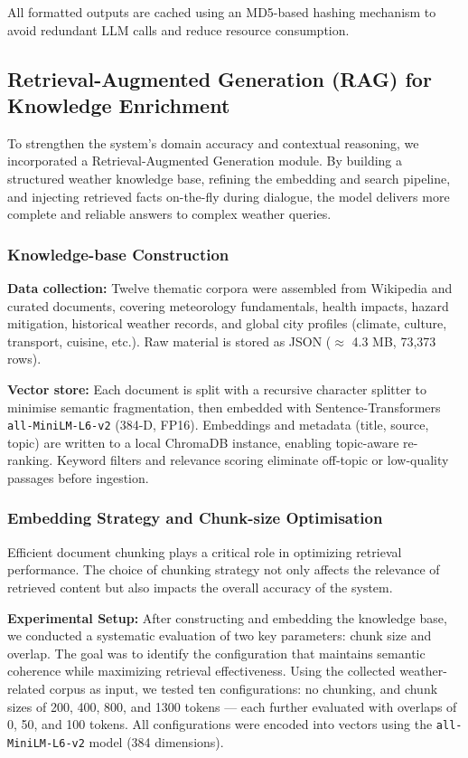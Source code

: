 \documentclass[final-report]{report-template}
\begin{document}
All formatted outputs are cached using an MD5-based hashing mechanism to avoid redundant LLM calls and reduce resource consumption.

\subsection{Retrieval-Augmented Generation (RAG) for Knowledge Enrichment}

To strengthen the system’s domain accuracy and contextual reasoning, we incorporated a Retrieval-Augmented Generation module. By building a structured weather knowledge base, refining the embedding and search pipeline, and injecting retrieved facts on-the-fly during dialogue, the model delivers more complete and reliable answers to complex weather queries.

\subsubsection{Knowledge-base Construction}

\textbf{Data collection:} Twelve thematic corpora were assembled from Wikipedia and curated documents, covering meteorology fundamentals, health impacts, hazard mitigation, historical weather records, and global city profiles (climate, culture, transport, cuisine, etc.). Raw material is stored as JSON ($\approx$ 4.3 MB, 73,373 rows).

\vspace{0.3em}
\textbf{Vector store:} Each document is split with a recursive character splitter to minimise semantic fragmentation, then embedded with Sentence-Transformers \texttt{all-MiniLM-L6-v2} (384-D, FP16). Embeddings and metadata (title, source, topic) are written to a local ChromaDB instance, enabling topic-aware re-ranking. Keyword filters and relevance scoring eliminate off-topic or low-quality passages before ingestion.

\subsubsection{Embedding Strategy and Chunk-size Optimisation}

Efficient document chunking plays a critical role in optimizing retrieval performance. The choice of chunking strategy not only affects the relevance of retrieved content but also impacts the overall accuracy of the system.

\textbf{Experimental Setup:}  
After constructing and embedding the knowledge base, we conducted a systematic evaluation of two key parameters: chunk size and overlap. The goal was to identify the configuration that maintains semantic coherence while maximizing retrieval effectiveness. Using the collected weather-related corpus as input, we tested ten configurations: no chunking, and chunk sizes of 200, 400, 800, and 1300 tokens — each further evaluated with overlaps of 0, 50, and 100 tokens. All configurations were encoded into vectors using the \texttt{all-MiniLM-L6-v2} model (384 dimensions).
\end{document}
